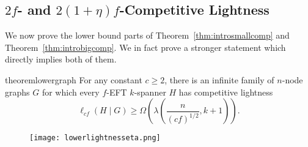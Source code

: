 \documentclass{article}
\theoremstyle{plain}
\theoremstyle{definition}
\begin{document}
\subsection{$2f$- and $2(1+\eta)f$-Competitive Lightness} \label{sec:lowerbigcompetitive}
We now prove the lower bound parts of Theorem~\ref{thm:introsmallcomp} and Theorem~\ref{thm:introbigcomp}.  We in fact prove a stronger statement which directly implies both of them.

\begin{restatable}{theorem}{lowergraph} \label{thm:lower-bound-lambda-graph}
     For any constant $c \geq 2$, there is an infinite family of $n$-node graphs $G$ for which every $f$-EFT $k$-spanner $H$ has competitive lightness
     $$\ell_{cf}(H \mid G) \geq \Omega\left(\lambda\left(\frac{n}{(cf)^{1/2}}, k+1\right)\right).$$
\end{restatable}
\begin{figure}[b]
    \centering
    \texttt{[image: lowerlightnesseta.png]}
    \label{fig:edgechange}
\end{figure}
\end{document}
